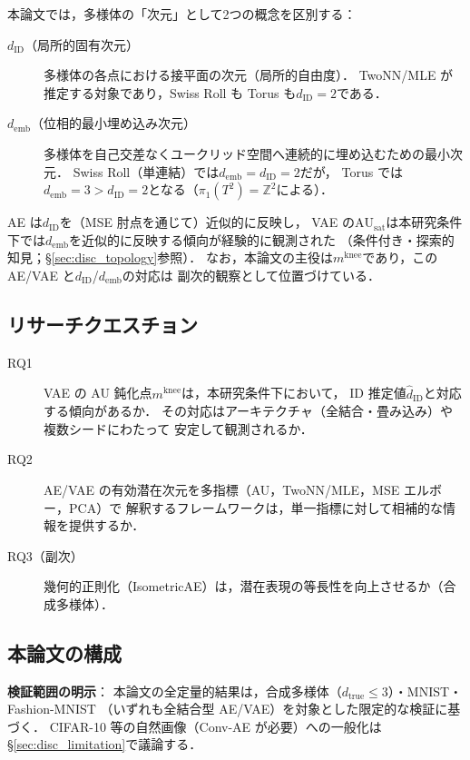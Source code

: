 \documentclass[11pt,a4paper]{jsarticle}
\newcommand{\dID}{d_{\mathrm{ID}}}
\newcommand{\AUsat}{\mathrm{AU}_{\mathrm{sat}}}
\newcommand{\mknee}{m^{\mathrm{knee}}}
\newcommand{\demb}{d_{\mathrm{emb}}}
\begin{document}
本論文では，多様体の「次元」として2つの概念を区別する：

\begin{description}
  \item[$\dID$（局所的固有次元）]
        多様体の各点における接平面の次元（局所的自由度）．
        TwoNN/MLE が推定する対象であり，Swiss Roll も Torus も$\dID = 2$である．
  \item[$\demb$（位相的最小埋め込み次元）]
        多様体を自己交差なくユークリッド空間へ連続的に埋め込むための最小次元．
        Swiss Roll（単連結）では$\demb = \dID = 2$だが，
        Torus では$\demb = 3 > \dID = 2$となる（$\pi_1(T^2) = \mathbb{Z}^2$による）．
\end{description}

AE は$\dID$を（MSE 肘点を通じて）近似的に反映し，
VAE の$\AUsat$は本研究条件下では$\demb$を近似的に反映する傾向が経験的に観測された
（条件付き・探索的知見；§\ref{sec:disc_topology}参照）．
なお，本論文の主役は$\mknee$であり，この AE/VAE と$\dID$/$\demb$の対応は
副次的観察として位置づけている．

\subsection{リサーチクエスチョン}\label{sec:intro_rq}

\begin{description}
  \item[RQ1] VAE の AU 鈍化点$\mknee$は，本研究条件下において，
             ID 推定値$\hat{d}_\mathrm{ID}$と対応する傾向があるか．
             その対応はアーキテクチャ（全結合・畳み込み）や複数シードにわたって
             安定して観測されるか．
  \item[RQ2] AE/VAE の有効潜在次元を多指標（AU，TwoNN/MLE，MSE エルボー，PCA）で
             解釈するフレームワークは，単一指標に対して相補的な情報を提供するか．
  \item[RQ3（副次）] 幾何的正則化（IsometricAE）は，潜在表現の等長性を向上させるか（合成多様体）．
\end{description}

\subsection{本論文の構成}\label{sec:intro_structure}

\textbf{検証範囲の明示}：
本論文の全定量的結果は，合成多様体（$d_{\mathrm{true}} \leq 3$）・MNIST・Fashion-MNIST
（いずれも全結合型 AE/VAE）を対象とした限定的な検証に基づく．
CIFAR-10 等の自然画像（Conv-AE が必要）への一般化は§\ref{sec:disc_limitation}で議論する．
\end{document}
